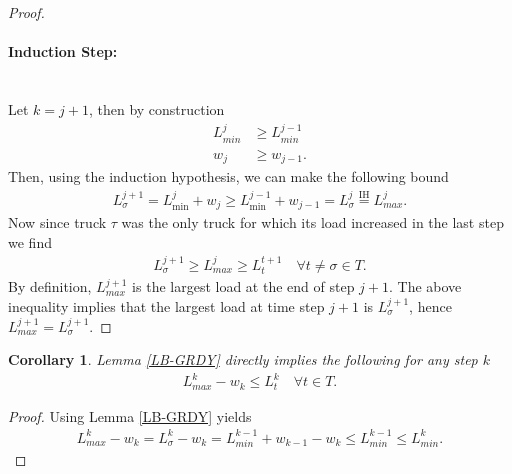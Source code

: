 \documentclass[12pt]{article}
\newtheorem{corollary}{Corollary}[theorem]
\begin{document}
\begin{proof}
\paragraph{Induction Step: } \mbox{} \\
Let $k = j+1$, then by construction
\begin{align*}
L_{min}^{j} &\geq L_{min}^{j-1} \\
w_{j} &\geq w_{j-1}.
\end{align*}
Then, using the induction hypothesis, we can make the following bound
\begin{gather*}
L_{\sigma}^{j+1} = L_{\min}^{j} + w_{j} \geq L_{\min}^{j-1} + w_{j-1} = L_{\sigma}^{j} \overset{\text{IH}}{=} L_{max}^{j}.
\end{gather*}
Now since truck $\tau$ was the only truck for which its load increased in the last step we find
\begin{gather*}
L_{\sigma}^{j+1} \geq L_{max}^{j} \geq L_{t}^{t+1} \quad \forall t \neq \sigma \in T.
\end{gather*}
By definition, $L_{max}^{j+1}$ is the largest load at the end of step $j+1$.
The above inequality implies that the largest load at time step $j+1$ is $L_{\sigma}^{j+1}$, hence $L_{max}^{j+1} = L_{\sigma}^{j+1}$.
\end{proof}

\begin{corollary} \label{LB-GRDY-CRL}
Lemma \ref{LB-GRDY} directly implies the following for any step $k$
\begin{gather}
L_{max}^{k} - w_k \leq L_t^{k} \quad \forall t \in T.
\end{gather}
\end{corollary}
\begin{proof}
Using Lemma \ref{LB-GRDY} yields
\begin{gather*}
L_{max}^{k} - w_{k} = L_{\sigma}^{k} - w_{k} = L_{min}^{k-1} + w_{k-1} - w_{k} \leq  L_{min}^{k-1} \leq L_{min}^{k}.
\end{gather*}

\end{proof}
\end{document}
